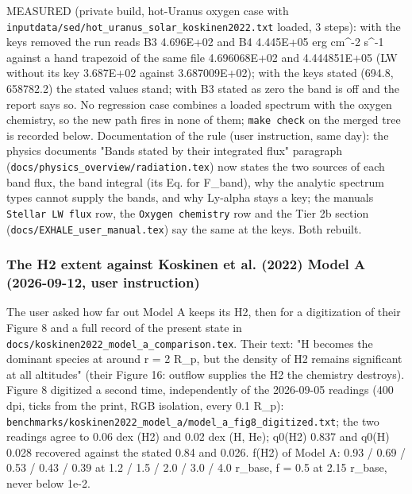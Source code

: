 \documentclass[english,a4paper]{my_memo}
\begin{document}
MEASURED (private build, hot-Uranus oxygen case with
\texttt{inputdata/sed/hot\_uranus\_solar\_koskinen2022.txt} loaded, 3 steps): with the
keys removed the run reads B3 4.696E+02 and B4 4.445E+05 erg cm\^{}-2 s\^{}-1
against a hand trapezoid of the same file 4.696068E+02 and 4.444851E+05 (LW
without its key 3.687E+02 against 3.687009E+02); with the keys stated
(694.8, 658782.2) the stated values stand; with B3 stated as zero the band
is off and the report says so. No regression case combines a loaded
spectrum with the oxygen chemistry, so the new path fires in none of them;
\texttt{make\ check} on the merged tree is recorded below.
Documentation of the rule (user instruction, same day): the physics
document\textquotesingle s "Bands stated by their integrated flux" paragraph
(\texttt{docs/physics\_overview/radiation.tex}) now states the two sources of each
band flux, the band integral (its Eq. for F\_band), why the analytic spectrum
types cannot supply the bands, and why Ly-alpha stays a key; the manual\textquotesingle s
\texttt{Stellar\ LW\ flux} row, the \texttt{Oxygen\ chemistry} row and the Tier 2b section
(\texttt{docs/EXHALE\_user\_manual.tex}) say the same at the keys. Both rebuilt.

\subsubsection{The H2 extent against Koskinen et al. (2022) Model A (2026-09-12, user instruction)}\label{the-h2-extent-against-koskinen-et-al-2022-model-a-2026-09-12-user-instruction}

The user asked how far out Model A keeps its H2, then for a digitization of
their Figure 8 and a full record of the present state in
\texttt{docs/koskinen2022\_model\_a\_comparison.tex}. Their text: "H becomes the
dominant species at around r = 2 R\_p, but the density of H2 remains
significant at all altitudes" (their Figure 16: outflow supplies the H2 the
chemistry destroys). Figure 8 digitized a second time, independently of the
2026-09-05 readings (400 dpi, ticks from the print, RGB isolation, every
0.1 R\_p): \texttt{benchmarks/koskinen2022\_model\_a/model\_a\_fig8\_digitized.txt};
the two readings agree to 0.06 dex (H2) and 0.02 dex (H, He); q0(H2) 0.837
and q0(H) 0.028 recovered against the stated 0.84 and 0.026. f(H2) of
Model A: 0.93 / 0.69 / 0.53 / 0.43 / 0.39 at 1.2 / 1.5 / 2.0 / 3.0 / 4.0
r\_base, f = 0.5 at 2.15 r\_base, never below 1e-2.
\end{document}
